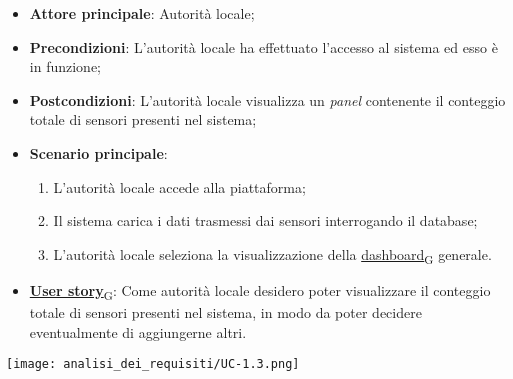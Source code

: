 \begin{itemize}
	\item \textbf{Attore principale}: Autorità locale;
	\item \textbf{Precondizioni}: L'autorità locale ha effettuato l'accesso al sistema ed esso è in funzione;
	\item \textbf{Postcondizioni}: L'autorità locale visualizza un \textit{panel} contenente il conteggio totale di sensori presenti nel sistema;
	\item \textbf{Scenario principale}:
	      \begin{enumerate}
		      \item L'autorità locale accede alla piattaforma;
		      \item Il sistema carica i dati trasmessi dai sensori interrogando il database;
		      \item L'autorità locale seleziona la visualizzazione della \href{https://7last.github.io/docs/rtb/documentazione-interna/glossario\#dashboard}{dashboard\textsubscript{G}} generale.
	      \end{enumerate}
	\item \href{https://7last.github.io/docs/rtb/documentazione-interna/glossario\#user-story}{\textbf{User story}\textsubscript{G}}:
	      Come autorità locale desidero poter visualizzare il conteggio totale di sensori presenti nel sistema, in modo da poter decidere eventualmente di aggiungerne altri.
\end{itemize}
\begin{center}
	\texttt{[image: analisi\_dei\_requisiti/UC-1.3.png]}
\end{center}

